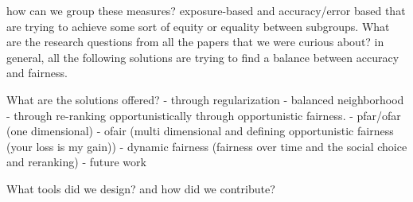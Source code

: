 



how can we group these measures? exposure-based and accuracy/error based that are trying to achieve some sort of equity or equality between subgroups.
What are the research questions from all the papers that we were curious about?
in general, all the following solutions are trying to find a balance between accuracy and fairness. 

What are the solutions offered?
- through regularization - balanced neighborhood
- through re-ranking opportunistically through opportunistic fairness.
    - pfar/ofar (one dimensional)
    - ofair (multi dimensional and defining opportunistic fairness (your loss is my gain))
    - dynamic fairness (fairness over time and the social choice and reranking)
    - future work

What tools did we design? and how did we contribute?

